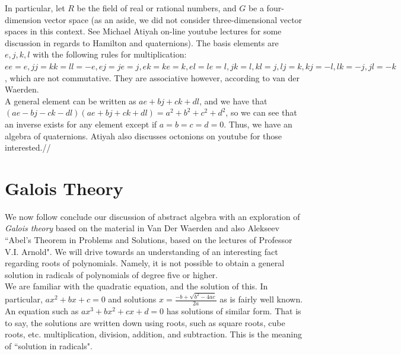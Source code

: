 In particular, let $R$ be the field of real or rational numbers, and $G$ be a four-dimension vector space (as an aside, we did not consider three-dimensional vector spaces in this context.  See Michael Atiyah on-line youtube lectures for some discussion in regards to Hamilton and quaternions).  The basis elements are $e,j,k,l$ with the following rules for multiplication:  $ee=e, jj=kk=ll=-e, ej=je=j, ek=ke=k, el=le=l,jk=l, kl=j, lj=k, kj=-l, lk=-j, jl=-k$, which are not commutative.  They are associative however, according to van der Waerden.\\

A general element can be written as $ae+bj+ck+dl$, and we have that $\left(ae-bj-ck-dl\right)\left(ae+bj+ck+dl\right)=a^{2}+b^{2}+c^{2}+d^{2}$, so we can see that an inverse exists for any element except if $a=b=c=d=0$.  Thus, we have an algebra of quaternions.  Atiyah also discusses octonions on youtube for those interested.//




\section{Galois Theory}

We now follow conclude our discussion of abstract algebra with an exploration of \textit{Galois theory} based on the material in Van Der Waerden and also Alekseev ``Abel's Theorem in Problems and Solutions, based on the lectures of Professor V.I. Arnold".  We will drive towards an understanding of an interesting fact regarding roots of polynomials.  Namely, it is not possible to obtain a general solution in radicals of polynomials of degree five or higher.\\

We are familiar with the quadratic equation, and the solution of this.  In particular, $ax^{2}+bx+c=0$ and solutions $x=\frac{-b+\sqrt{b^{2}-4ac}}{2a}$ as is fairly well known.  An equation such as $ax^{3}+bx^{2}+cx+d=0$ has solutions of similar form.  That is to say, the solutions are written down using roots, such as square roots, cube roots, etc. multiplication, division, addition, and subtraction.  This is the meaning of ``solution in radicals".\\

